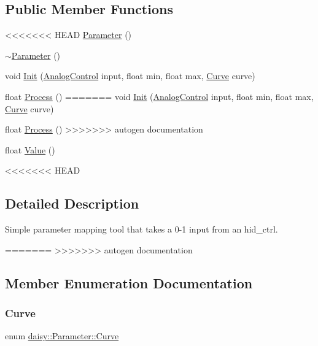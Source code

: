 \subsection*{Public Member Functions}
\begin{DoxyCompactItemize}
\item 
<<<<<<< HEAD
\hyperlink{classdaisy_1_1_parameter_ac53e51f76edd3958bc201a8eda419afb}{Parameter} ()
\item 
\hyperlink{classdaisy_1_1_parameter_ad29a1b19206bc6568d085ddb4eaa14d9}{$\sim$\+Parameter} ()
\item 
void \hyperlink{classdaisy_1_1_parameter_a0dc0293e425569511a73c311bfa54f48}{Init} (\hyperlink{classdaisy_1_1_analog_control}{Analog\+Control} input, float min, float max, \hyperlink{classdaisy_1_1_parameter_a2fcb1b7095721f0de77594aabb9594da}{Curve} curve)
\item 
float \hyperlink{classdaisy_1_1_parameter_a6af6747924f1651e6698a4d72c86532d}{Process} ()
=======
void \hyperlink{classdaisy_1_1_parameter_a1904b8eaea19797e761f391fe0bf987a}{Init} (\hyperlink{classdaisy_1_1_analog_control}{Analog\+Control} input, float min, float max, \hyperlink{classdaisy_1_1_parameter_a2fcb1b7095721f0de77594aabb9594da}{Curve} curve)
\item 
float \hyperlink{classdaisy_1_1_parameter_ae966c4abcd064809da4a497b45d84a83}{Process} ()
>>>>>>> autogen documentation
\item 
float \hyperlink{classdaisy_1_1_parameter_a0599bc2fa6dae903698de8ee499a0306}{Value} ()
\end{DoxyCompactItemize}


<<<<<<< HEAD
\subsection{Detailed Description}
Simple parameter mapping tool that takes a 0-\/1 input from an hid\+\_\+ctrl. 

=======
>>>>>>> autogen documentation
\subsection{Member Enumeration Documentation}
\mbox{\label{classdaisy_1_1_parameter_a2fcb1b7095721f0de77594aabb9594da}} 
\subsubsection{\texorpdfstring{Curve}{Curve}}
{\footnotesize\ttfamily enum \hyperlink{classdaisy_1_1_parameter_a2fcb1b7095721f0de77594aabb9594da}{daisy\+::\+Parameter\+::\+Curve}}

